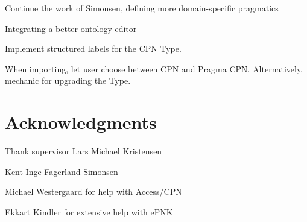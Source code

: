 Continue the work of Simonsen, defining more domain-specific pragmatics

Integrating a better ontology editor

Implement structured labels for the CPN Type.

When importing, let user choose between CPN and Pragma CPN. Alternatively,
mechanic for upgrading the Type.

\section{Acknowledgments}

Thank supervisor Lars Michael Kristensen

Kent Inge Fagerland Simonsen

Michael Westergaard for help with Access/CPN

Ekkart Kindler for extensive help with ePNK